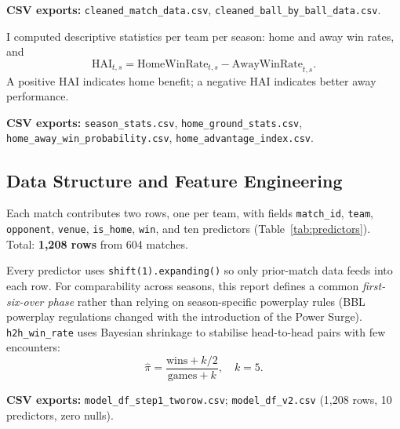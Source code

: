 \documentclass[12pt,a4paper]{article}
\begin{document}
\textbf{CSV exports:} \texttt{cleaned\_match\_data.csv}, \texttt{cleaned\_ball\_by\_ball\_data.csv}.

I computed descriptive statistics per team per season: home and away win rates, and
\[
  \text{HAI}_{t,s} = \text{HomeWinRate}_{t,s} - \text{AwayWinRate}_{t,s}.
\]
A positive HAI indicates home benefit; a negative HAI indicates better away performance.

\textbf{CSV exports:} \texttt{season\_stats.csv}, \texttt{home\_ground\_stats.csv},
\texttt{home\_away\_win\_probability.csv}, \texttt{home\_advantage\_index.csv}.

\subsection{Data Structure and Feature Engineering}

Each match contributes two rows, one per team, with fields \texttt{match\_id},
\texttt{team}, \texttt{opponent}, \texttt{venue}, \texttt{is\_home}, \texttt{win}, and ten
predictors (Table~\ref{tab:predictors}). Total: \textbf{1,208 rows} from 604 matches.

Every predictor uses \texttt{shift(1).expanding()} so only prior-match data feeds into each
row. For comparability across seasons, this report defines a common
\textit{first-six-over phase} rather than relying on season-specific powerplay rules (BBL
powerplay regulations changed with the introduction of the Power Surge). \texttt{h2h\_win\_rate}
uses Bayesian shrinkage to stabilise head-to-head pairs with few encounters:
\[
  \hat{\pi} = \frac{\text{wins} + k/2}{\text{games} + k}, \quad k = 5.
\]

\textbf{CSV exports:} \texttt{model\_df\_step1\_tworow.csv}; \texttt{model\_df\_v2.csv}
(1,208 rows, 10 predictors, zero nulls).
\end{document}
